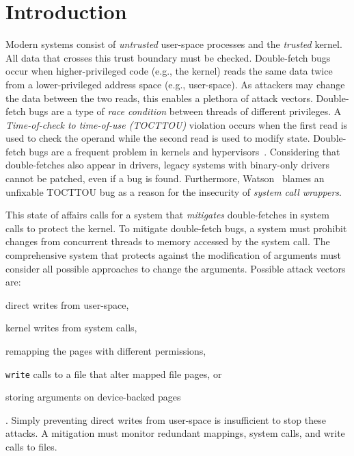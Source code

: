 \documentclass[conference]{IEEEtran}
\begin{document}
\section{Introduction}

Modern systems consist of \emph{untrusted} user-space processes and the
\emph{trusted} kernel.  All data that crosses this trust boundary must be
checked.  Double-fetch bugs~\cite{serna08doublefetch, twizsgrakky07ring0,
wilhelm2016xenpwn, wang2018survey} occur when higher-privileged code (e.g., the
kernel) reads the same data twice from a lower-privileged address space (e.g.,
user-space). As attackers may change the data between the two reads, this
enables a plethora of attack vectors.  Double-fetch bugs are a type of
\emph{race condition} between threads of different privileges. A
\emph{Time-of-check to time-of-use (TOCTTOU)} violation occurs when the first
read is used to check the operand while the second read is used to modify
state.  Double-fetch bugs are a frequent problem in kernels and
hypervisors~\cite{cve201812633, cve202012652, cve20131332, cve201920610,
cve20158550, cve201610439, cve201610435, cve201610433, cve20195519,
cve20168438}. Considering that double-fetches also appear in drivers, legacy
systems with binary-only drivers cannot be patched, even if a bug is found.
Furthermore, Watson~\cite{watson2007exploiting} blames an unfixable TOCTTOU bug
as a reason for the insecurity of \emph{system call wrappers}.  

This state of affairs calls for a system that \emph{mitigates} double-fetches in
system calls to protect the kernel.
To mitigate double-fetch bugs, a system must prohibit changes from
concurrent threads to memory accessed by the system call.
The comprehensive system that protects against the modification of arguments
must consider all possible approaches to change the arguments.
Possible attack vectors are:
\begin{enumerate*}[label=(\roman*)]
\item \label{attk:direct} direct writes from user-space,
\item \label{attk:systemcall} kernel writes from system calls,
\item \label{attk:remapping} remapping the pages with different permissions,
\item \label{attk:writebuffers}\texttt{write} calls to a file that alter mapped
file pages, or
\item \label{attk:devicefiles} storing arguments on device-backed pages
\end{enumerate*}.
Simply preventing direct writes from user-space is insufficient to stop these attacks.
A mitigation must monitor redundant mappings, system calls, and write
calls to files.
\end{document}
